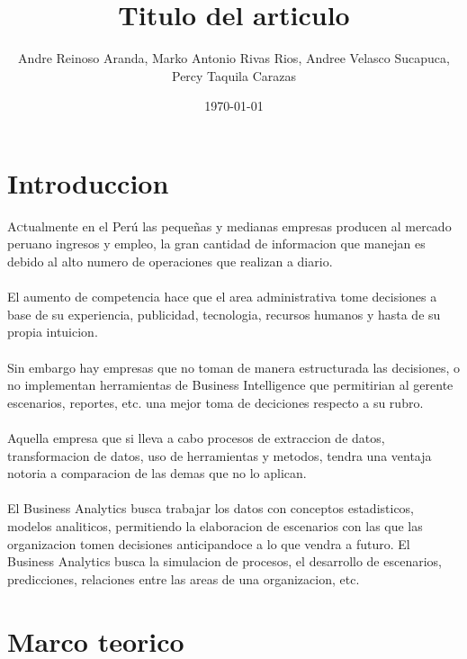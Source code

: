 \documentclass[twoside,twocolumn]{article}
\title{Titulo del articulo}
\author{Andre Reinoso Aranda, Marko Antonio Rivas Rios, Andree Velasco Sucapuca, \\
Percy Taquila Carazas }
\date{\today}
\begin{document}
\maketitle


\section{Introduccion}
\lettrine[nindent=0em,lines=3]{A}ctualmente en el Perú las pequeñas y medianas empresas producen al mercado peruano ingresos y empleo, la gran cantidad de informacion que manejan es debido al alto numero de operaciones que realizan a diario.\\ \\
El aumento de competencia hace que el area administrativa tome decisiones a base de su experiencia, publicidad, tecnologia, recursos humanos y hasta de su propia intuicion.\\ \\
Sin embargo hay empresas que no toman de manera estructurada las decisiones, o no implementan herramientas de Business Intelligence que permitirian al gerente escenarios, reportes, etc. una mejor toma de deciciones respecto a su rubro. \\ \\
Aquella empresa que si lleva a cabo procesos de extraccion de datos, transformacion de datos, uso de herramientas y metodos, tendra una ventaja notoria a comparacion de las demas que no lo aplican.
\\ \\
El Business Analytics busca trabajar los datos con conceptos estadisticos, modelos analiticos, permitiendo la elaboracion de escenarios con las que las organizacion tomen decisiones anticipandoce a lo que vendra a futuro. El Business Analytics busca la simulacion de procesos, el desarrollo de escenarios, predicciones, relaciones entre las areas de una organizacion, etc.


\section{Marco teorico}
\end{document}
